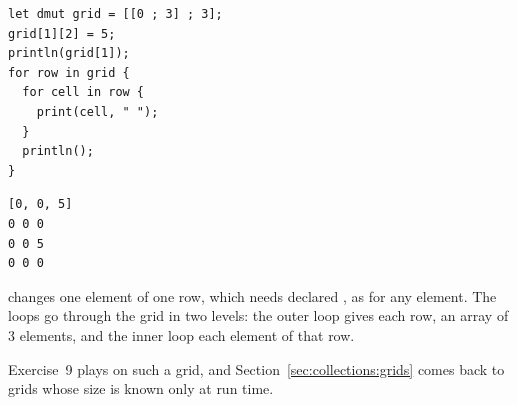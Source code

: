 \begin{lstlisting}[style=coloredverbatim]
let dmut grid = [[0 ; 3] ; 3];
grid[1][2] = 5;
println(grid[1]);
for row in grid {
  for cell in row {
    print(cell, " ");
  }
  println();
}
\end{lstlisting}
\vspace{-10pt}%
\begin{lstlisting}[style=bashVerb]
[0, 0, 5]
0 0 0
0 0 5
0 0 0
\end{lstlisting}

 changes one element of one row, which needs
 declared , as for any element. The loops go through
the grid in two levels: the outer loop gives each row, an array of 3 elements,
and the inner loop each element of that row.

Exercise~9 plays on such a grid, and Section~\ref{sec:collections:grids} comes
back to grids whose size is known only at run time.
